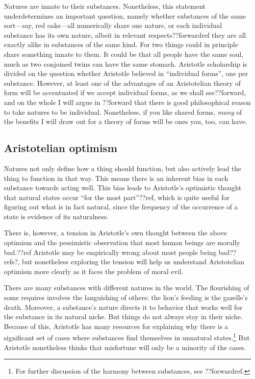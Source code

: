 Natures are innate to their substances. Nonetheless, this statement underdetermines an important question, namely whether 
substances of the same sort---say, red oaks---all numerically share one nature, or each individual substance has its own nature, 
albeit in relevant respects??forwardref they are all exactly alike in substances of the same kind. For two things could in
principle share something innate to them. It could be that all people have the same soul, much as two conjoined twins can
have the same stomach. Aristotle scholarship is divided on the question whether Aristotle believed in ``individual forms'',
one per substance. However, at least one of the advantages of an Aristotelian theory of form will be accentuated if we accept 
individual forms, as we shall see??forward, and on the whole I will argue in ??forward that there is good
philosophical reason to take natures to be individual.
Nonetheless, if you like shared forms, 
\textit{many} of the benefits I will draw out for a theory of forms will be ones you, too, can have. 

\subsection{Aristotelian optimism}
Natures not only define how a thing should function, but also actively lead the thing to function in that way.
This means there is an inherent bias in each substance towards acting well. This bias leads to Aristotle's
optimistic thought that natural states occur ``for the most part''??ref, which is quite useful for figuring out
what is in fact natural, since the frequency of the occurrence of a state is evidence of its naturalness.

There is, however, a tension in Aristotle's own thought between the above optimism and the pessimistic observation 
that most human beings are morally bad.??ref Aristotle may be empirically wrong about most people being bad??refs?,
but nonetheless exploring the tension will help us understand Aristotelian optimism more clearly as it faces the
problem of moral evil.

There are many substances with different natures in the world. The flourishing of some requires involves the languishing
of others: the lion's feeding is the gazelle's death. Moreover, a substance's nature directs it to behavior that works
well for the substance in its natural niche. But things do not always stay in their niche. Because of this, Aristotle
has many resources for explaining why there is a significant set of cases where substances find themselves in unnatural
states.\footnote{For further discussion of the harmony between substances, see ??forwardref.} But Aristotle nonetheless
thinks that misfortune will only be a minority of the cases.

